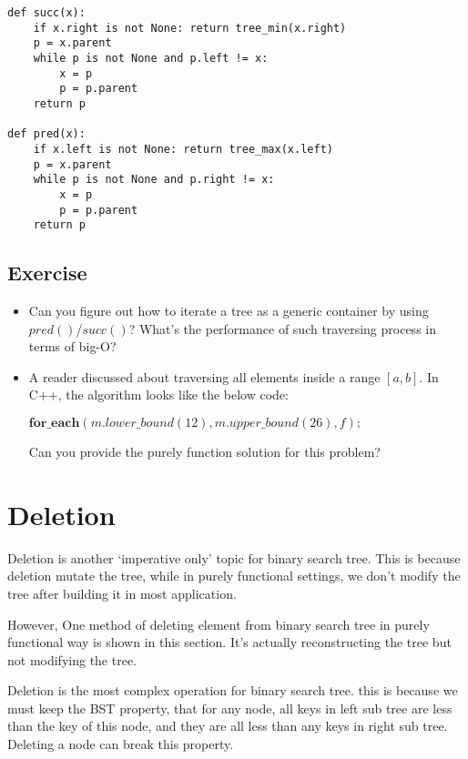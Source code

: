 \documentclass{article}
\begin{document}
\lstset{language=Python}
\begin{lstlisting}
def succ(x):
    if x.right is not None: return tree_min(x.right)
    p = x.parent
    while p is not None and p.left != x:
        x = p
        p = p.parent
    return p

def pred(x):
    if x.left is not None: return tree_max(x.left)
    p = x.parent
    while p is not None and p.right != x:
        x = p
        p = p.parent
    return p
\end{lstlisting}

\subsection*{Exercise}

\begin{itemize}
\item Can you figure out how to iterate a tree as a generic container
by using $pred()$/$succ()$? What's the performance of such traversing
process in terms of big-O?

\item A reader discussed about traversing all elements inside a 
range $[a, b]$. In C++, the algorithm looks like the below code:

$\mathbf{for\_each} (m.lower\_bound(12), m.upper\_bound(26), f);$

Can you provide the purely function solution for this problem?
\end{itemize}


\section{Deletion}
Deletion is another `imperative only' topic for binary search tree.
This is because deletion mutate the tree, while in purely functional
settings, we don't modify the tree after building it in most 
application.

However, One method of deleting element from binary search
tree in purely functional way is shown in this section. It's actually
reconstructing the tree but not modifying the tree.

Deletion is the most complex operation for binary search tree. 
this is because we must keep the BST property, that for any node,
all keys in left sub tree are less than the key of this node, and
they are all less than any keys in right sub tree. Deleting a node
can break this property.
\end{document}

